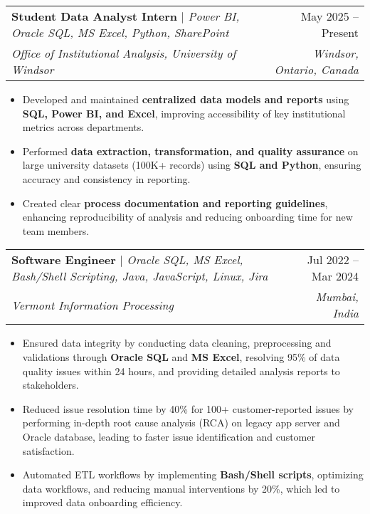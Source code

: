 \documentclass[letterpaper,11pt]{article}
\makeatletter
\newcommand{\resumeItem}[1]{
  \item\small{
    {#1 \vspace{-2pt}}
  }
}
\newcommand{\resumeExperienceSubheading}[5]{
  \vspace{-2pt}\item
    \begin{tabular*}{0.97\textwidth}[t]{l@{\extracolsep{\fill}}r}
      \textbf{#1} \emph{\small#2} & #3 \\
      \textit{\small#4} & \textit{\small #5} \\
    \end{tabular*}\vspace{-7pt}
}
\newcommand{\resumeSubSubheading}[2]{
    \item
    \begin{tabular*}{0.97\textwidth}{l@{\extracolsep{\fill}}r}
      \textit{\small#1} & \textit{\small #2} \\
    \end{tabular*}\vspace{-7pt}
}
\newcommand{\resumeSubHeadingListEnd}{\end{itemize}}
\newcommand{\resumeItemListStart}{\begin{itemize}}
\newcommand{\resumeItemListEnd}{\end{itemize}\vspace{-5pt}}
\makeatother
\begin{document}
\resumeExperienceSubheading
{Student Data Analyst Intern}{$|$ Power BI, Oracle SQL, MS Excel, Python, SharePoint}{May 2025 -- Present}
{Office of Institutional Analysis, University of Windsor}{Windsor, Ontario, Canada}

\resumeItemListStart
\resumeItem{Developed and maintained \textbf{centralized data models and reports} using \textbf{SQL, Power BI, and Excel}, improving accessibility of key institutional metrics across departments.}
\resumeItem{Performed \textbf{data extraction, transformation, and quality assurance} on large university datasets (100K+ records) using \textbf{SQL and Python}, ensuring accuracy and consistency in reporting.}
\resumeItem{Created clear \textbf{process documentation and reporting guidelines}, enhancing reproducibility of analysis and reducing onboarding time for new team members.}

\resumeItemListEnd

\resumeExperienceSubheading
{Software Engineer}{$|$ Oracle SQL, MS Excel, Bash/Shell Scripting, Java, JavaScript, Linux, Jira}{Jul 2022 -- Mar 2024}
{Vermont Information Processing}{Mumbai, India}

\resumeItemListStart
\resumeItem{Ensured data integrity by conducting data cleaning, preprocessing and validations through \textbf{Oracle SQL} and \textbf{MS Excel}, resolving 95\% of data quality issues within 24 hours, and providing detailed analysis reports to stakeholders.}
\vspace{-11pt}
\resumeItem{Reduced issue resolution time by 40\% for 100+ customer-reported issues by performing in-depth root cause analysis (RCA) on legacy app server and Oracle database, leading to faster issue identification and customer satisfaction.}
\resumeItem{Automated ETL workflows by implementing \textbf{Bash/Shell scripts}, optimizing data workflows, and reducing manual interventions by 20\%, which led to improved data onboarding efficiency.}
\resumeItemListEnd

\end{document}
